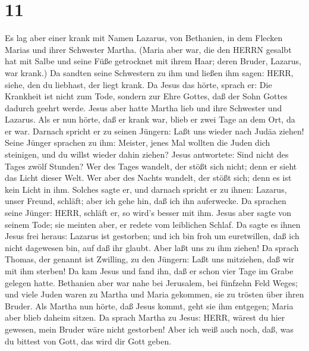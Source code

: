 \hypertarget{section-10}{%
\section{11}\label{section-10}}

 Es lag aber einer krank mit Namen Lazarus, von Bethanien,
in dem Flecken Marias und ihrer Schwester Martha.  (Maria
aber war, die den HERRN gesalbt hat mit Salbe und seine Füße getrocknet
mit ihrem Haar; deren Bruder, Lazarus, war krank.)  Da
sandten seine Schwestern zu ihm und ließen ihm sagen: HERR, siehe, den
du liebhast, der liegt krank.  Da Jesus das hörte, sprach
er: Die Krankheit ist nicht zum Tode, sondern zur Ehre Gottes, daß der
Sohn Gottes dadurch geehrt werde.  Jesus aber hatte Martha
lieb und ihre Schwester und Lazarus.  Als er nun hörte, daß
er krank war, blieb er zwei Tage an dem Ort, da er war. 
Darnach spricht er zu seinen Jüngern: Laßt uns wieder nach Judäa ziehen!
 Seine Jünger sprachen zu ihm: Meister, jenes Mal wollten
die Juden dich steinigen, und du willst wieder dahin ziehen?
 Jesus antwortete: Sind nicht des Tages zwölf Stunden? Wer
des Tages wandelt, der stößt sich nicht; denn er sieht das Licht dieser
Welt.  Wer aber des Nachts wandelt, der stößt sich; denn es
ist kein Licht in ihm.  Solches sagte er, und darnach
spricht er zu ihnen: Lazarus, unser Freund, schläft; aber ich gehe hin,
daß ich ihn auferwecke.  Da sprachen seine Jünger: HERR,
schläft er, so wird's besser mit ihm.  Jesus aber sagte von
seinem Tode; sie meinten aber, er redete vom leiblichen Schlaf.
 Da sagte es ihnen Jesus frei heraus: Lazarus ist
gestorben;  und ich bin froh um euretwillen, daß ich nicht
dagewesen bin, auf daß ihr glaubt. Aber laßt uns zu ihm ziehen!
 Da sprach Thomas, der genannt ist Zwilling, zu den
Jüngern: Laßt uns mitziehen, daß wir mit ihm sterben!  Da
kam Jesus und fand ihn, daß er schon vier Tage im Grabe gelegen hatte.
 Bethanien aber war nahe bei Jerusalem, bei fünfzehn Feld
Weges;  und viele Juden waren zu Martha und Maria gekommen,
sie zu trösten über ihren Bruder.  Als Martha nun hörte,
daß Jesus kommt, geht sie ihm entgegen; Maria aber blieb daheim sitzen.
 Da sprach Martha zu Jesus: HERR, wärest du hier gewesen,
mein Bruder wäre nicht gestorben!  Aber ich weiß auch noch,
daß, was du bittest von Gott, das wird dir Gott geben. 
